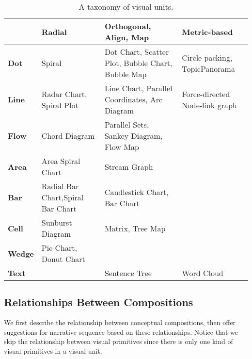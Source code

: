 \begin{table}[tb]
  \caption{A taxonomy of visual units.}
  \label{tab:unit}
  \small
  \centering
  \begin{tabular}{p{0.8cm}|p{2.0cm}|p{2.0cm}|p{2.0cm}}
  \toprule
 \textbf{} &\textbf{Radial} &\textbf{Orthogonal, Align, Map} &\textbf{Metric-based}   \\ 
  \midrule
  \textbf{Dot} &Spiral&Dot Chart, Scatter Plot, Bubble Chart, Bubble Map &Circle packing, TopicPanorama\cite{7042494}\\
  \midrule
  \textbf{Line}&  Radar Chart, Spiral Plot    &Line Chart, Parallel Coordinates, Arc Diagram &  Force-directed Node-link graph   \\ 
  \midrule
   \textbf{Flow}&  Chord Diagram   &Parallel Sets, Sankey Diagram, 
   Flow Map  & \\
  \midrule
  \textbf{Area}&  Area Spiral Chart &Stream Graph &  \\ 
  \midrule
  \textbf{Bar}&      Radial Bar Chart,Spiral Bar Chart  & Candlestick Chart, Bar Chart  &   \\
  \midrule
  \textbf{Cell}& Sunburst Diagram  &Matrix, Tree Map &  \\
  \midrule
  \textbf{Wedge}& Pie Chart, Donut Chart &  &  \\
  \midrule
  \textbf{Text}&    &  Sentence Tree  & Word Cloud \\
  \bottomrule
  
  \end{tabular}
  \vspace{1mm}
\end{table}

\subsection{Relationships Between Compositions}
\label{relationship}
We first describe the relationship between conceptual compositions, then offer suggestions for narrative sequence based on these relationships. Notice that we skip the relationship between visual primitives since there is only one kind of visual primitives in a visual unit. 

